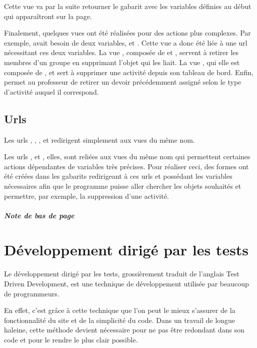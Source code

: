 \documentclass[a4paper,10pt,french]{sphinxmanual}
\begin{document}
Cette vue va par la suite retourner le gabarit  avec les
variables définies au début qui apparaîtront sur la page.

Finalement, quelques vues ont été réalisées pour des actions plus complexes.
Par exemple,  avait besoin de deux variables, 
et . Cette vue a donc été liée à une url nécessitant ces deux
variables. La vue , composée de  et
, servent à retirer les membres d'un groupe en supprimant
l'objet  qui les liait. La vue , qui elle est
composée de ,  et  sert à
supprimer une activité depuis son tableau de bord. Enfin,  permet
au professeur de retirer un devoir précédemment assigné selon le type d'activité
auquel il correspond.


\section{Urls}
\label{documentation:urls}
Les urls , , ,  et 
redirigent simplement aux vues du même nom.

Les urls ,  et , elles,
sont reliées aux vues du même nom qui permettent certaines actions dépendantes
de variables très précises. Pour réaliser ceci, des formes ont été créées dans
les gabarits redirigeant à ces urls et possédant les variables nécessaires afin
que le programme puisse aller chercher les objets souhaités et permettre, par
exemple, la suppression d'une activité.
\paragraph{Note de bas de page}


\chapter{Développement dirigé par les tests}
\label{tdd::doc}\label{tdd:developpement-dirige-par-les-tests}
Le développement dirigé par les tests, grossièrement traduit de l'anglais Test
Driven Development, est une technique de développement utilisée par beaucoup de
programmeurs.

En effet, c'est grâce à cette technique que l'on peut le mieux s'assurer de la
fonctionnalité du site et de la simplicité du code. Dans un travail de longue
haleine, cette méthode devient nécessaire pour ne pas être redondant dans son
code et pour le rendre le plus clair possible.
\end{document}
